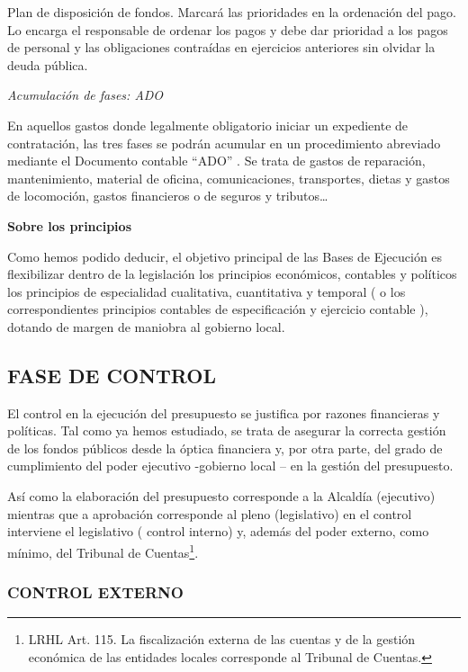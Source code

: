 \documentclass[
]{article}
\begin{document}
Plan de disposición de fondos. Marcará las prioridades en la ordenación
del pago. Lo encarga el responsable de ordenar los pagos y debe dar
prioridad a los pagos de personal y las obligaciones contraídas en
ejercicios anteriores sin olvidar la deuda pública.

\emph{Acumulación de fases: ADO}

En aquellos gastos donde legalmente obligatorio iniciar un expediente de
contratación, las tres fases se podrán acumular en un procedimiento
abreviado mediante el Documento contable ``ADO'' . Se trata de gastos de
reparación, mantenimiento, material de oficina, comunicaciones,
transportes, dietas y gastos de locomoción, gastos financieros o de
seguros y tributos\ldots{}

\textbf{Sobre los principios}

Como hemos podido deducir, el objetivo principal de las Bases de
Ejecución es flexibilizar dentro de la legislación los principios
económicos, contables y políticos los principios de especialidad
cualitativa, cuantitativa y temporal ( o los correspondientes principios
contables de especificación y ejercicio contable ), dotando de margen de
maniobra al gobierno local.

\hypertarget{fase-de-control}{%
\subsection{FASE DE CONTROL}\label{fase-de-control}}

El control en la ejecución del presupuesto se justifica por razones
financieras y políticas. Tal como ya hemos estudiado, se trata de
asegurar la correcta gestión de los fondos públicos desde la óptica
financiera y, por otra parte, del grado de cumplimiento del poder
ejecutivo -gobierno local -- en la gestión del presupuesto.

Así como la elaboración del presupuesto corresponde a la Alcaldía
(ejecutivo) mientras que a aprobación corresponde al pleno (legislativo)
en el control interviene el legislativo ( control interno) y, además del
poder externo, como mínimo, del Tribunal de Cuentas\footnote{LRHL Art.
  115. La fiscalización externa de las cuentas y de la gestión económica
  de las entidades locales corresponde al Tribunal de Cuentas.}.

\hypertarget{control-externo}{%
\subsubsection{CONTROL EXTERNO}\label{control-externo}}
\end{document}
